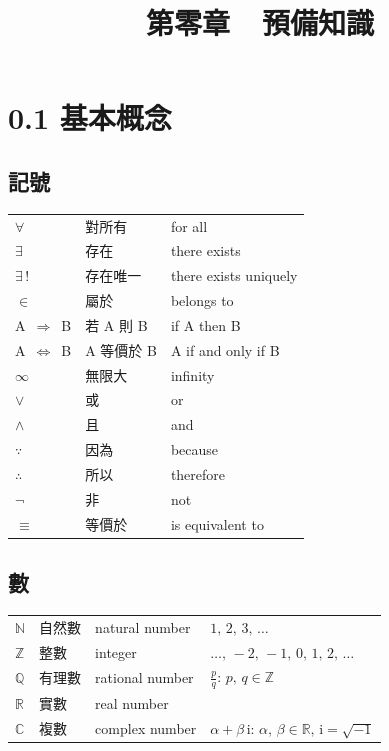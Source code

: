 \documentclass[12pt]{extarticle}
\newcommand{\ds}{\displaystyle}
\newcommand{\mi}{\mathrm{i}}
\theoremstyle{definition}
\begin{document}
\title{\texorpdfstring{\vspace{-2em} 第零章\ \ 預備知識}{第零章\ \ 預備知識}} 
\author{\vspace{-5em}}
\date{\vspace{-5em}}
\maketitle
\thispagestyle{firststyle}

\section*{0.1 基本概念}
\subsection*{記號}

\begin{table}[!htbp]
  \centering
  \begin{tabular}{lll}
    \toprule
    $\forall$ & 對所有 & for all \\
    $\exists$ & 存在   & there exists \\
    $\exists\,!$ & 存在唯一 & there exists uniquely \\
    $\in$ & 屬於 & belongs to \\
    A $\,\Longrightarrow\,$ B &  若 A 則 B & if A then B \\
    A $\,\Longleftrightarrow\,$ B &  A 等價於 B & A if and only if B \\
    $\infty$ & 無限大 & infinity \\
    $\vee$ & 或 & or \\
    $\wedge$ & 且 & and \\
    $\because$ & 因為 & because \\
    $\therefore$ & 所以 & therefore \\
    $\neg$ & 非 & not \\
    $\equiv$ & 等價於 & is equivalent to \\
    \bottomrule
  \end{tabular}
\end{table}

\subsection*{數}

\begin{table}[!htbp]
  \centering
  \begin{tabular}{llll}
    \toprule
    $\mathbb{N}$ & 自然數 & natural number & $1,\,2,\,3,\,\ldots$ \\
    $\mathbb{Z}$ & 整數   & integer & $\ldots,\,-2,\,-1,\,0,\,1,\,2,\,\ldots$\\
    $\mathbb{Q}$ & 有理數 & rational number & $\ds\frac{p}{q}: \,p,\,q\in\mathbb{Z}$ \\
    $\mathbb{R}$ & 實數 & real number &  \\
    $\mathbb{C}$ & 複數 & complex number & $\ds\alpha + \beta\,\mi: \,\alpha,\,\beta\in\mathbb{R},\,\mi = \sqrt{-1}$ \\
    \bottomrule
  \end{tabular}
\end{table}
\end{document}
